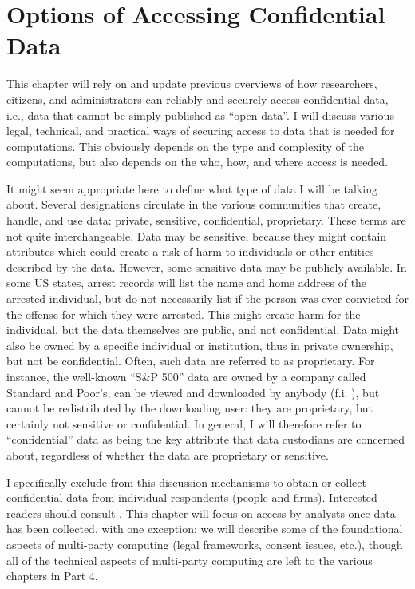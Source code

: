 \chapter{Options of Accessing Confidential Data}

This chapter will rely on and update previous overviews of how researchers, citizens, and administrators can reliably and securely access confidential data, i.e., data that cannot be simply published as ``open data''. I will discuss various legal, technical, and practical ways of securing access to data that is needed for computations. This obviously depends on the type and complexity of the computations, but also depends on the who, how, and where access is needed.

It might seem appropriate here to define what type of data I will be talking about. Several designations circulate in the various communities that create, handle, and use data: private, sensitive, confidential, proprietary. These terms are not quite interchangeable. Data may be sensitive, because they might contain attributes which could create a risk of harm to individuals or other entities described by the data. However, some sensitive data may be publicly available. In some US states, arrest records will list the name and home address of the arrested individual, but do not necessarily list if the person was ever convicted for the offense for which they were arrested. This might create harm for the individual, but the data themselves are public, and not confidential. Data might also be owned by a specific individual or institution, thus in private ownership, but not be confidential. Often, such data are referred to as proprietary. For instance, the well-known ``S\&P 500'' data are owned by a company called Standard and Poor's, can be viewed and downloaded by anybody (f.i. \cite{sp_dow_jones_indices_llc_sp_2020}), but cannot be redistributed by the downloading user: they are proprietary, but certainly not sensitive or confidential. In general, I will therefore refer to ``confidential'' data as being the key attribute that data custodians are concerned about, regardless of whether the data are proprietary or sensitive. 

I specifically exclude from this discussion mechanisms to obtain or collect confidential data from individual respondents (people and firms). Interested readers should consult \cite{groves_survey_2009}. This chapter will focus on access by analysts once data has been collected, with one exception: we will describe some of the foundational aspects of multi-party computing (legal frameworks, consent issues, etc.), though all of the technical aspects of multi-party computing are left to the various chapters in Part 4.

